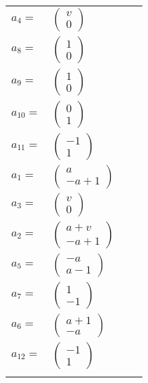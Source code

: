 \documentclass[1p]{elsarticle_modified}
\theoremstyle{definition}
\begin{document}
\begin{tabular}{m{7pt} m{180pt} m{7pt} m{180pt} }
\flushright $a_{4}=$&$\begin{pmatrix}v\\0\end{pmatrix}$ \\
\flushright $a_{8}=$&$\begin{pmatrix}1\\0\end{pmatrix}$ \\
\flushright $a_{9}=$&$\begin{pmatrix}1\\0\end{pmatrix}$ \\
\flushright $a_{10}=$&$\begin{pmatrix}0\\1\end{pmatrix}$ \\
\flushright $a_{11}=$&$\begin{pmatrix}-1\\1\end{pmatrix}$ \\
\flushright $a_{1}=$&$\begin{pmatrix}a\\- a+1\end{pmatrix}$ \\
\flushright $a_{3}=$&$\begin{pmatrix}v\\0\end{pmatrix}$ \\
\flushright $a_{2}=$&$\begin{pmatrix}a+v\\- a+1\end{pmatrix}$ \\
\flushright $a_{5}=$&$\begin{pmatrix}- a\\a-1\end{pmatrix}$ \\
\flushright $a_{7}=$&$\begin{pmatrix}1\\-1\end{pmatrix}$ \\
\flushright $a_{6}=$&$\begin{pmatrix}a+1\\- a\end{pmatrix}$ \\
\flushright $a_{12}=$&$\begin{pmatrix}-1\\1\end{pmatrix}$\\&\end{tabular}
\end{document}

